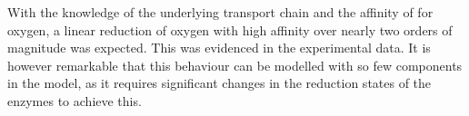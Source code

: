 With the knowledge of the underlying transport chain and the affinity of \cbbthree{} for oxygen, a linear reduction of oxygen with high affinity over nearly two orders of magnitude was expected. This was evidenced in the experimental data. It is however remarkable that this behaviour can be modelled with so few components in the model, as it requires significant changes in the reduction states of the enzymes to achieve this.
